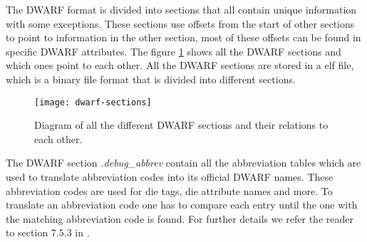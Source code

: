  


The \gls{DWARF} format is divided into sections that all contain unique information with some exceptions.
These sections use offsets from the start of other sections to point to information in the other section, most of these offsets can be found in specific \gls{DWARF} attributes.
The figure \ref{fig:dwarfsections} shows all the \gls{DWARF} sections and which ones point to each other.
All the \gls{DWARF} sections are stored in a \gls{elf} file, which is a binary file format that is divided into different sections.




\begin{figure}[h]
	\centering
	\texttt{[image: dwarf-sections]}
	\caption{Diagram of all the different \gls{DWARF} sections and their relations to each other.}
	\label{fig:dwarfsections}
\end{figure}


The \gls{DWARF} section \emph{.debug\_abbrev} contain all the abbreviation tables which are used to translate abbreviation codes into its official \gls{DWARF} names.
These abbreviation codes are used for \gls{die} tags, \gls{die} attribute names and more.
To translate an abbreviation code one has to compare each entry until the one with the matching abbreviation code is found.
For further details we refer the reader to section $7.5.3$ in \cite{dwarf}.


